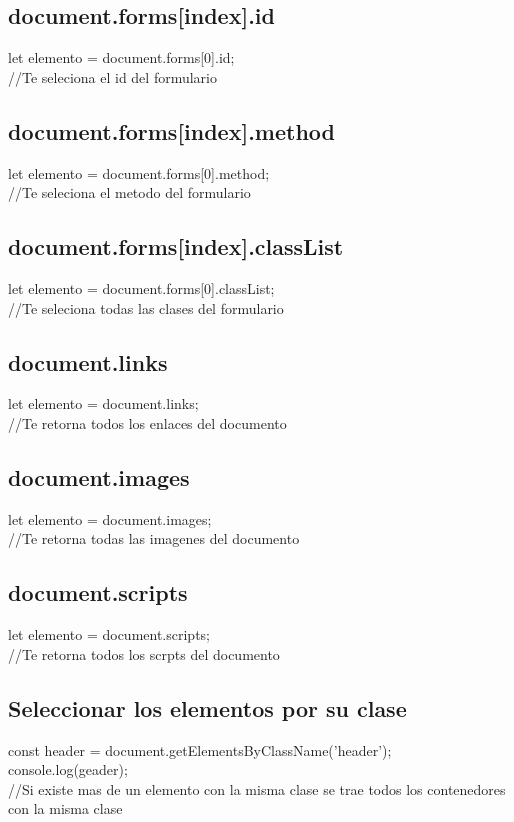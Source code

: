 \documentclass[10pt,a4paper]{article}
\begin{document}
\subsection{document.forms[index].id} 
let elemento = document.forms[0].id; \\
//Te seleciona el id del formulario\\
\subsection{document.forms[index].method} 
let elemento = document.forms[0].method; \\
//Te seleciona el metodo del formulario\\
\subsection{document.forms[index].classList} 
let elemento = document.forms[0].classList; \\
//Te seleciona todas las clases del formulario\\

\newpage
\subsection{document.links} 
let elemento = document.links; \\
//Te retorna todos los enlaces del documento\\
\subsection{document.images} 
let elemento = document.images; \\
//Te retorna todas las imagenes del documento\\
\subsection{document.scripts} 
let elemento = document.scripts; \\
//Te retorna todos los scrpts del documento\\
\subsection{Seleccionar los elementos por su clase} 
const header  = document.getElementsByClassName('header');\\
console.log(geader);\\
//Si existe mas de un elemento con la misma clase se trae todos los contenedores con la misma clase \\
\end{document}
